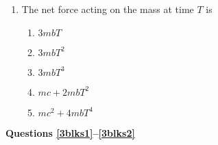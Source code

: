 \documentclass{../../oss-apphys}
\begin{document}
\begin{multicols}{2}
\begin{enumerate}[resume,leftmargin=18pt]
  \item The net force acting on the mass at time $T$ is
    \begin{enumerate}[noitemsep,topsep=0pt,leftmargin=18pt,label=(\Alph*)]
    \item $3mbT$
    \item $3mbT^2$
    \item $3mbT^3$
    \item $mc+2mbT^2$
    \item $mc^2+4mbT^4$
    \end{enumerate}
    \label{q:striaght2}


  \end{enumerate}
  
  \textbf{Questions \ref{3blks1}--\ref{3blks2}}


\end{multicols}
\end{document}
